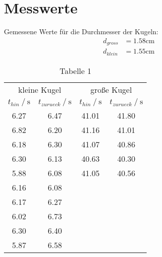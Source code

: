 \section{Messwerte}
\label{sec:Messwerte}

Gemessene Werte für die Durchmesser der Kugeln:
\begin{align*}
    d_{gross} &= 1.58\unit{\centi\meter}\\
    d_{klein} &= 1.55\unit{\centi\meter}
\end{align*}

\begin{table}
    \centering
    \caption{Tabelle 1}
    \begin{tabular}{cccc}
      \toprule
      \multicolumn{2}{c}{kleine Kugel} & \multicolumn{2}{c}{große Kugel} \\
      \cmidrule(lr){1-2} \cmidrule(lr){3-4}
      {$t_{hin} \mathbin{/} \unit{\second}$} &
      {$t_{zurueck} \mathbin{/} \unit{\second}$} &
      {$t_{hin} \mathbin{/} \unit{\second}$} &
      {$t_{zurueck} \mathbin{/} \unit{\second}$} \\
      \midrule
        6.27 & 6.47 & 41.01 & 41.80 \\
        6.82 & 6.20 & 41.16 & 41.01 \\
        6.18 & 6.30 & 41.07 & 40.86 \\
        6.30 & 6.13 & 40.63 & 40.30 \\
        5.88 & 6.08 & 41.05 & 40.56 \\
        6.16 & 6.08 \\
        6.17 & 6.27 \\
        6.02 & 6.73 \\
        6.30 & 6.40 \\
        5.87 & 6.58 \\
      \bottomrule
    \end{tabular}
    \label{tab:Tabelle1}
\end{table}

